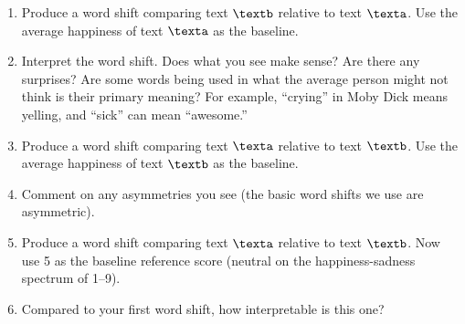 \begin{enumerate}
  \begin{enumerate} 
  \item 
    Produce a word shift comparing text $\textb$ relative to text $\texta$.
    Use the average happiness of text $\texta$ as the baseline.
  \item 
    Interpret the word shift. Does what you see make sense?
    Are there any surprises?
    Are some words being used in what the average person might not think is their primary meaning?
    For example, ``crying'' in Moby Dick means yelling, and ``sick'' can mean ``awesome.''
  \item
    Produce a word shift comparing text $\texta$ relative to text $\textb$.
    Use the average happiness of text $\textb$ as the baseline.
  \item
    Comment on any asymmetries you see (the basic word shifts we use are asymmetric).
  \item
    Produce a word shift comparing text $\texta$ relative to text $\textb$.
    Now use 5 as the baseline reference score (neutral on the happiness-sadness spectrum of 1--9).
  \item
    Compared to your first word shift, how interpretable is this one?
  \end{enumerate}

  
   \solutionstart


   \solutionend

\end{enumerate}

